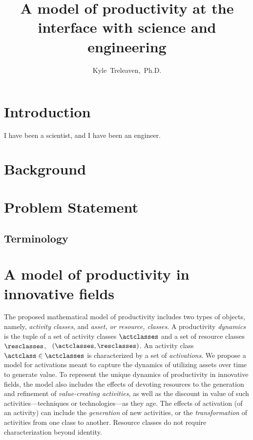 \documentclass[10pt,a4paper]{article}
\title{A model of productivity at the interface with science and engineering}
\author{Kyle~Treleaven,~Ph.D.}
\begin{document}
\maketitle

\section{Introduction}

I have been a scientist, and I have been an engineer.

\section{Background}

\section{Problem Statement}

\subsection{Terminology}


\section{A model of productivity in innovative fields}



\makecommand{\timevar}{\tau}

The proposed mathematical model of productivity includes two types of objects, namely, \emph{activity classes}, and \emph{asset, or resource, classes}.
A productivity \emph{dynamics} is the tuple of a set of activity classes $\actclasses$ and a set of resource classes $\resclasses$, \ie~$(\actclasses,\resclasses)$.
An activity class $\actclass \in \actclasses$ is characterized by a set of \emph{activations}.
We propose a model for activations meant to capture the dynamics of utilizing assets over time to generate value.
To represent the unique dynamics of productivity in innovative fields, the model also includes the effects of devoting resources to the generation and refinement of \emph{value-creating activities}, as well as the discount in value of such activities---techniques or technologies---as they age.
The effects of activation (of an activity) can include the \emph{generation} of new activities, or the \emph{transformation} of activities from one class to another.
Resource classes do not require characterization beyond identity.
\end{document}
